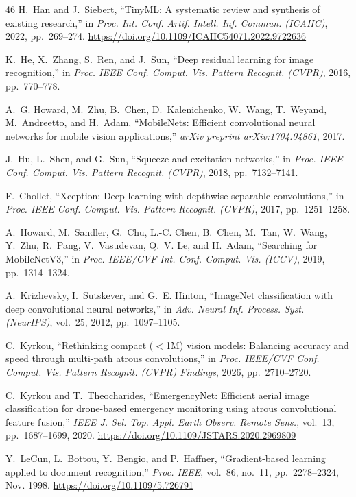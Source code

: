 \documentclass[journal]{IEEEtran}
\providecommand{\doi}[1]{\url{https://doi.org/#1}}
\begin{document}
\begin{thebibliography}{46}
H.~Han and J.~Siebert, ``TinyML: A systematic review and synthesis of existing research,'' in \emph{Proc. Int. Conf. Artif. Intell. Inf. Commun. (ICAIIC)}, 2022, pp.~269--274. \doi{10.1109/ICAIIC54071.2022.9722636}

K.~He, X.~Zhang, S.~Ren, and J.~Sun, ``Deep residual learning for image recognition,'' in \emph{Proc. IEEE Conf. Comput. Vis. Pattern Recognit. (CVPR)}, 2016, pp.~770--778.

A.~G. Howard, M.~Zhu, B.~Chen, D.~Kalenichenko, W.~Wang, T.~Weyand, M.~Andreetto, and H.~Adam, ``MobileNets: Efficient convolutional neural networks for mobile vision applications,'' \emph{arXiv preprint arXiv:1704.04861}, 2017.

J.~Hu, L.~Shen, and G.~Sun, ``Squeeze-and-excitation networks,'' in \emph{Proc. IEEE Conf. Comput. Vis. Pattern Recognit. (CVPR)}, 2018, pp.~7132--7141.

F.~Chollet, ``Xception: Deep learning with depthwise separable convolutions,'' in \emph{Proc. IEEE Conf. Comput. Vis. Pattern Recognit. (CVPR)}, 2017, pp.~1251--1258.

A.~Howard, M.~Sandler, G.~Chu, L.-C. Chen, B.~Chen, M.~Tan, W.~Wang, Y.~Zhu, R.~Pang, V.~Vasudevan, Q.~V. Le, and H.~Adam, ``Searching for MobileNetV3,'' in \emph{Proc. IEEE/CVF Int. Conf. Comput. Vis. (ICCV)}, 2019, pp.~1314--1324.

A.~Krizhevsky, I.~Sutskever, and G.~E. Hinton, ``ImageNet classification with deep convolutional neural networks,'' in \emph{Adv. Neural Inf. Process. Syst. (NeurIPS)}, vol.~25, 2012, pp.~1097--1105.

C.~Kyrkou, ``Rethinking compact ($<$1M) vision models: Balancing accuracy and speed through multi-path atrous convolutions,'' in \emph{Proc. IEEE/CVF Conf. Comput. Vis. Pattern Recognit. (CVPR) Findings}, 2026, pp.~2710--2720.

C.~Kyrkou and T.~Theocharides, ``EmergencyNet: Efficient aerial image classification for drone-based emergency monitoring using atrous convolutional feature fusion,'' \emph{IEEE J. Sel. Top. Appl. Earth Observ. Remote Sens.}, vol.~13, pp.~1687--1699, 2020. \doi{10.1109/JSTARS.2020.2969809}

Y.~LeCun, L.~Bottou, Y.~Bengio, and P.~Haffner, ``Gradient-based learning applied to document recognition,'' \emph{Proc. IEEE}, vol.~86, no.~11, pp.~2278--2324, Nov. 1998. \doi{10.1109/5.726791}


\end{thebibliography}
\end{document}

